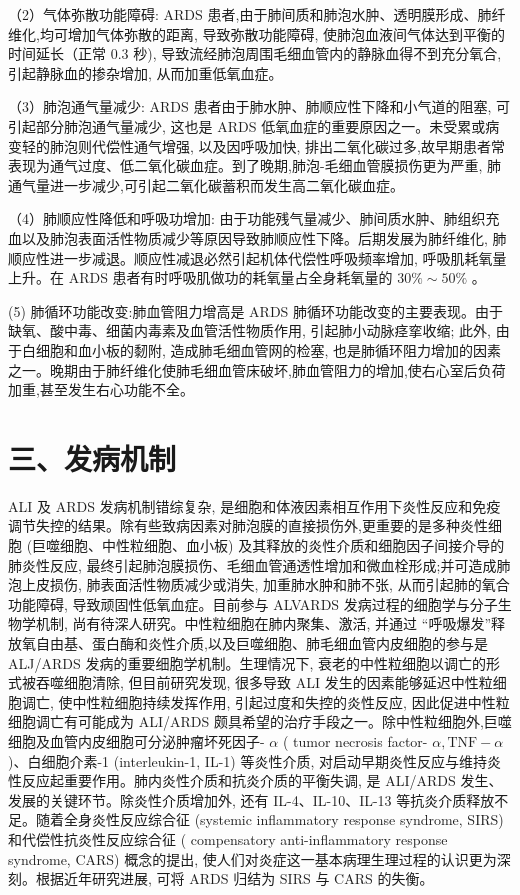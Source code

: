 \documentclass[10pt]{article}
\begin{document}
（2）气体弥散功能障碍: ARDS 患者,由于肺间质和肺泡水肿、透明膜形成、肺纤维化,均可增加气体弥散的距离, 导致弥散功能障碍, 使肺泡血液间气体达到平衡的时间延长（正常 0.3 秒), 导致流经肺泡周围毛细血管内的静脉血得不到充分氧合,引起静脉血的掺杂增加, 从而加重低氧血症。

（3）肺泡通气量减少: ARDS 患者由于肺水肿、肺顺应性下降和小气道的阻塞, 可引起部分肺泡通气量减少, 这也是 ARDS 低氧血症的重要原因之一。未受累或病变轻的肺泡则代偿性通气增强, 以及因呼吸加快, 排出二氧化碳过多,故早期患者常表现为通气过度、低二氧化碳血症。到了晚期,肺泡-毛细血管膜损伤更为严重, 肺通气量进一步减少,可引起二氧化碳蓄积而发生高二氧化碳血症。

（4）肺顺应性降低和呼吸功增加: 由于功能残气量减少、肺间质水肿、肺组织充血以及肺泡表面活性物质减少等原因导致肺顺应性下降。后期发展为肺纤维化, 肺顺应性进一步减退。顺应性减退必然引起机体代偿性呼吸频率增加, 呼吸肌耗氧量上升。在 ARDS 患者有时呼吸肌做功的耗氧量占全身耗氧量的 $30 \% \sim 50 \%$ 。

(5) 肺循环功能改变:肺血管阻力增高是 ARDS 肺循环功能改变的主要表现。由于缺氧、酸中毒、细菌内毒素及血管活性物质作用, 引起肺小动脉痉挛收缩; 此外, 由于白细胞和血小板的䵑附, 造成肺毛细血管网的检塞, 也是肺循环阻力增加的因素之一。晚期由于肺纤维化使肺毛细血管床破坏,肺血管阻力的增加,使右心室后负荷加重,甚至发生右心功能不全。

\section*{三、发病机制}
ALI 及 ARDS 发病机制错综复杂, 是细胞和体液因素相互作用下炎性反应和免疫调节失控的结果。除有些致病因素对肺泡膜的直接损伤外,更重要的是多种炎性细胞 (巨噬细胞、中性粒细胞、血小板) 及其释放的炎性介质和细胞因子间接介导的肺炎性反应, 最终引起肺泡膜损伤、毛细血管通透性增加和微血栓形成;并可造成肺泡上皮损伤, 肺表面活性物质减少或消失, 加重肺水肿和肺不张, 从而引起肺的氧合功能障碍, 导致顽固性低氧血症。目前参与 ALVARDS 发病过程的细胞学与分子生物学机制, 尚有待深人研究。中性粒细胞在肺内聚集、激活, 并通过 “呼吸爆发”释放氧自由基、蛋白酶和炎性介质,以及巨噬细胞、肺毛细血管内皮细胞的参与是 ALJ/ARDS 发病的重要细胞学机制。生理情况下, 衰老的中性粒细胞以调亡的形式被吞噬细胞清除, 但目前研究发现, 很多导致 ALI 发生的因素能够延迟中性粒细胞调亡, 使中性粒细胞持续发挥作用, 引起过度和失控的炎性反应, 因此促进中性粒细胞调亡有可能成为 ALI/ARDS 颇具希望的治疗手段之一。除中性粒细胞外,巨噬细胞及血管内皮细胞可分泌肿瘤坏死因子- $\alpha$ ( tumor necrosis factor- $\alpha, \mathrm{TNF}-\alpha$ )、白细胞介素-1 (interleukin-1, IL-1) 等炎性介质, 对启动早期炎性反应与维持炎性反应起重要作用。肺内炎性介质和抗炎介质的平衡失调, 是 ALI/ARDS 发生、发展的关键环节。除炎性介质增加外, 还有 IL-4、IL-10、IL-13 等抗炎介质释放不足。随着全身炎性反应综合征 (systemic inflammatory response syndrome, SIRS) 和代偿性抗炎性反应综合征 ( compensatory anti-inflammatory response syndrome, CARS) 概念的提出, 使人们对炎症这一基本病理生理过程的认识更为深刻。根据近年研究进展, 可将 ARDS 归结为 SIRS 与 CARS 的失衡。
\end{document}
